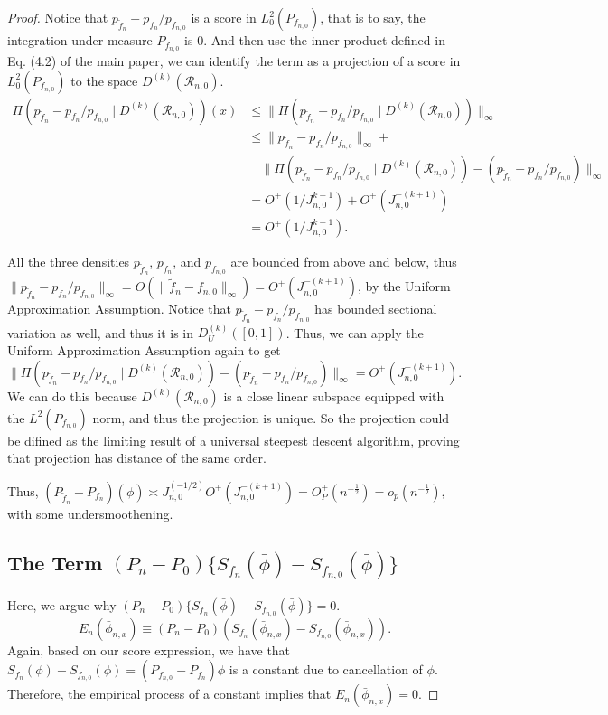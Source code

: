 \begin{proof}
Notice that $p_{\tilde f_n} - p_{f_n}/p_{f_{n,0}}$ is a score in $L_0^2(P_{f_{n,0}})$, that is to say, the integration under measure $P_{f_{n,0}}$ is 0. And then use the inner product defined in Eq. (4.2) of the main paper, we can identify the term as a projection of a score in $L_0^2(P_{f_{n,0}})$ to the space $D^{(k)}(\mathcal{R}_{n,0})$. 
\begin{align*}
   \Pi(p_{\tilde f_n} - p_{f_n}/p_{f_{n,0}} \mid D^{(k)}(\mathcal{R}_{n,0}))(x) &\leq \|\Pi(p_{\tilde f_n} - p_{f_n}/p_{f_{n,0}} \mid D^{(k)}(\mathcal{R}_{n,0}))\|_\infty \\
   &\leq \|p_{\tilde f_n} - p_{f_n}/p_{f_{n,0}} \|_\infty + \\
   &\quad \|\Pi(p_{\tilde f_n} - p_{f_n}/p_{f_{n,0}} \mid D^{(k)}(\mathcal{R}_{n,0})) - (p_{\tilde f_n} - p_{f_n}/p_{f_{n,0}}) \|_\infty \\
   &= O^+(1/J_{n,0}^{k+1}) + O^+(J_{n,0}^{-(k+1)}) \\
   &= O^+(1/J_{n,0}^{k+1}).
\end{align*}

All the three densities $p_{\tilde f_n}$, $p_{f_n}$, and $p_{f_{n,0}}$ are bounded from above and below, thus $\|p_{\tilde f_n} - p_{f_n}/p_{f_{n,0}} \|_\infty = O(\|\tilde f_n - f_{n,0}\|_{\infty}) = O^+(J_{n,0}^{-(k+1)})$, by the Uniform Approximation Assumption. Notice that $p_{\tilde f_n} - p_{f_n}/p_{f_{n,0}}$ has bounded sectional variation as well, and thus it is in $D^{(k)}_U([0,1])$. Thus, we can apply the Uniform Approximation Assumption again to get $\|\Pi(p_{\tilde f_n} - p_{f_n}/p_{f_{n,0}} \mid D^{(k)}(\mathcal{R}_{n,0})) - (p_{\tilde f_n} - p_{f_n}/p_{f_{n,0}}) \|_\infty = O^+(J_{n,0}^{-(k+1)})$. We can do this because $D^{(k)}(\mathcal{R}_{n,0})$ is a close linear subspace equipped with the $L^2(P_{f_{n,0}})$ norm, and thus the projection is unique. So the projection could be difined as the limiting result of a universal steepest descent algorithm, proving that projection has distance of the same order.

Thus, $(P_{\tilde f_n} - P_{f_n})(\bar\phi) \asymp J_{n,0}^{(-1/2)} O^+(J_{n,0}^{-(k+1)}) = O_P^+(n^{-\frac{1}{2}}) = o_p(n^{-\frac{1}{2}}),$ with some undersmoothening.

\subsection*{The Term $(P_n-P_0)\bigl\{S_{f_n}(\bar\phi)-S_{f_{n,0}}(\bar\phi)\bigr\}$}

Here, we argue why $(P_n-P_0)\bigl\{S_{f_n}(\bar\phi)-S_{f_{n,0}}(\bar\phi)\bigr\}=0.$
\[
E_n(\bar{\phi}_{n,x})\equiv (P_n-P_0)(S_{f_n}(\bar{\phi}_{n,x})-S_{f_{n,0}}(\bar{\phi}_{n,x})).\]
Again, based on our score expression, we have that $S_{f_n}(\phi)-S_{f_{n,0}}(\phi)=(P_{f_{n,0}}-P_{f_n})\phi$ is a constant due to cancellation of $\phi$. Therefore, the empirical process of a constant implies that $E_n(\bar{\phi}_{n,x})=0$.

\end{proof}

